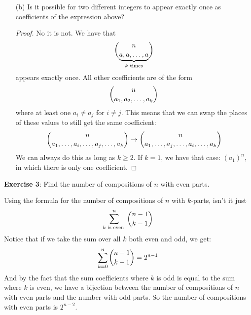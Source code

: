 \documentclass{article}
\begin{document}
\begin{itemize}
        \item [(b)] Is it possible for two different integers to appear exactly once as coefficients of the expression above? 
            \begin{proof}
                No it is not. We have that 
                    \begin{equation*}
                        \dbinom{n}{\underbrace{a, a, \ldots, a}_{k \text{ times}}}
                    \end{equation*}
                appears exactly once. All other coefficients are of the form
                    \begin{equation*}
                        \dbinom{n}{a_{1}, a_{2}, \ldots, a_{k}}
                    \end{equation*}
                where at least one $a_{i} \neq a_{j}$ for $i \neq j$. This means that we can swap the places of these values to still get the same coefficient:
                    \begin{equation*}
                        \dbinom{n}{a_{1}, \ldots, a_{i}, \ldots, a_{j}, \ldots, a_{k}} \rightarrow \dbinom{n}{a_{1}, \ldots, a_{j}, \ldots , a_{i}, \ldots , a_{k}}
                    \end{equation*}
                We can always do this as long as $k \geq  2$. If $k = 1$, we have that case: $(a_{1})^{n}$, in which there is only one coefficient.
            \end{proof}
    \end{itemize}

\textbf{Exercise 3}: Find the number of compositions of $n$ with even parts.
    \begin{answer}
        Using the formula for the number of compositions of $n$ with $k$-parts, isn't it just
            \begin{equation*}
                \sum_{k \text{ is even }}^{n} \dbinom{n - 1}{k - 1}
            \end{equation*}
        Notice that if we take the sum over all $k$ both even and odd, we get:
            \begin{equation*}
                \sum_{k = 0}^{n} \dbinom{n - 1}{k - 1} = 2^{n - 1}
            \end{equation*}
        And by the fact that the sum coefficients where $k$ is odd is equal to the sum where $k$ is even, we have a bijection between the number of compositions of $n$ with even parts and the number with odd parts. So the number of compositions with even parts is $2^{n - 2}$.
    \end{answer}
\end{document}
